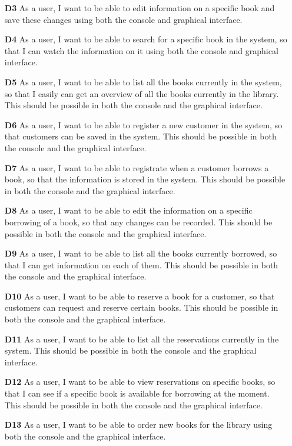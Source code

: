 \begin{itemize}
  \item [\textbf{D3}] As a user, I want to be able to edit information on a specific book and save these changes using both the console and graphical interface.
  \item [\textbf{D4}] As a user, I want to be able to search for a specific book in the system, so that I can watch the information on it using both the console and graphical interface.
  \item [\textbf{D5}] As a user, I want to be able to list all the books currently in the system, so that I easily can get an overview of all the books currently in the library. This should be possible in both the console and the graphical interface.
  \item [\textbf{D6}] As a user, I want to be able to register a new customer in the system, so that customers can be saved in the system. This should be possible in both the console and the graphical interface.
  \item [\textbf{D7}] As a user, I want to be able to registrate when a customer borrows a book, so that the information is stored in the system. This should be possible in both the console and the graphical interface.
  \item [\textbf{D8}] As a user, I want to be able to edit the information on a specific borrowing of a book, so that any changes can be recorded. This should be possible in both the console and the graphical interface.
  \item [\textbf{D9}] As a user, I want to be able to list all the books currently borrowed, so that I can get information on each of them. This should be possible in both the console and the graphical interface.
  \item [\textbf{D10}] As a user, I want to be able to reserve a book for a customer, so that customers can request and reserve certain books. This should be possible in both the console and the graphical interface.
  \item [\textbf{D11}] As a user, I want to be able to list all the reservations currently in the system. This should be possible in both the console and the graphical interface.
  \item [\textbf{D12}] As a user, I want to be able to view reservations on specific books, so that I can see if a specific book is available for borrowing at the moment. This should be possible in both the console and the graphical interface.
  \item [\textbf{D13}] As a user, I want to be able to order new books for the library using both the console and the graphical interface.
\end{itemize}

